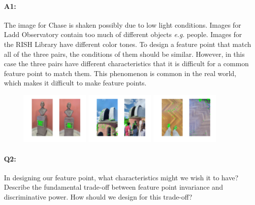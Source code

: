 \paragraph{A1:} The image for Chase is shaken possibly due to low light conditions. Images for Ladd Observatory contain too much of different objects \emph{e.g.} people. Images for the RISH Library have different color tones. To design a feature point that match all of the three pairs, the conditions of them should be similar. However, in this case the three pairs have different characteristics that it is difficult for a common feature point to match them. This phenomenon is common in the real world, which makes it difficult to make  feature points.
\begin{figure}[h!]
	\centering
	\includegraphics[width=0.3\textwidth]{../code/chase.png}
	\includegraphics[width=0.3\textwidth]{../code/ladd.png}
	\includegraphics[width=0.3\textwidth]{../code/rish.png}
\end{figure}




\pagebreak
\paragraph{Q2:} In designing our feature point, what characteristics might we wish it to have? Describe the fundamental trade-off between feature point invariance and discriminative power. How should we design for this trade-off?

